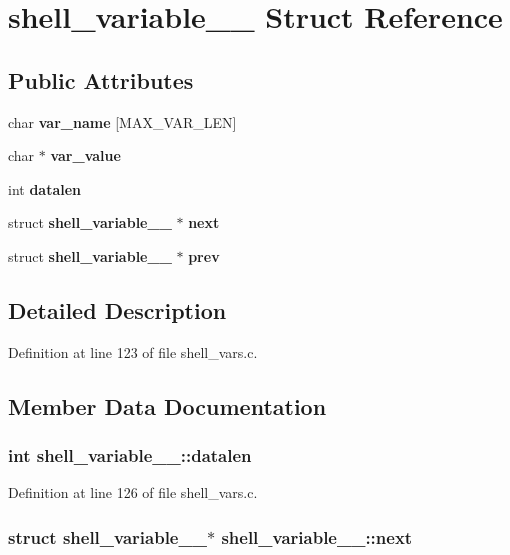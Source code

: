 \section{shell\_\-variable\_\-\_\- Struct Reference}
\label{structshell__variable____}
\subsection*{Public Attributes}
\begin{CompactItemize}
\item 
char {\bf var\_\-name} [MAX\_\-VAR\_\-LEN]
\item 
char $\ast$ {\bf var\_\-value}
\item 
int {\bf datalen}
\item 
struct {\bf shell\_\-variable\_\-\_\-} $\ast$ {\bf next}
\item 
struct {\bf shell\_\-variable\_\-\_\-} $\ast$ {\bf prev}
\end{CompactItemize}


\subsection{Detailed Description}


Definition at line 123 of file shell\_\-vars.c.

\subsection{Member Data Documentation}
\subsubsection[{datalen}]{\setlength{\rightskip}{0pt plus 5cm}int {\bf shell\_\-variable\_\-\_\-::datalen}}\label{structshell__variable_____6f5d028f344b6409880a78b60c6bdc1c}




Definition at line 126 of file shell\_\-vars.c.
\subsubsection[{next}]{\setlength{\rightskip}{0pt plus 5cm}struct {\bf shell\_\-variable\_\-\_\-}$\ast$ {\bf shell\_\-variable\_\-\_\-::next}\hspace{0.3cm}{\tt  [read]}}\label{structshell__variable_____df6c563db01cac7c20c4d761a6beaf11}




